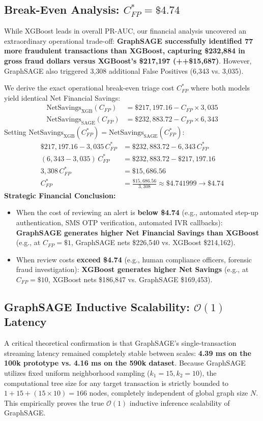 \documentclass[11pt,a4paper]{report}
\begin{document}
\subsection{Break-Even Analysis: $C_{FP}^* = \$4.74$}
While XGBoost leads in overall PR-AUC, our financial analysis uncovered an extraordinary operational trade-off:
\textbf{GraphSAGE successfully identified 77 more fraudulent transactions than XGBoost, capturing \$232,884 in gross fraud dollars versus XGBoost's \$217,197 (++\$15,687)}.
However, GraphSAGE also triggered 3,308 additional False Positives (6,343 vs. 3,035).

We derive the exact operational break-even triage cost $C_{FP}^*$ where both models yield identical Net Financial Savings:
\begin{align}
\text{NetSavings}_{\text{XGB}}(C_{FP}) &= \$217{,}197.16 - C_{FP} \times 3{,}035 \\
\text{NetSavings}_{\text{SAGE}}(C_{FP}) &= \$232{,}883.72 - C_{FP} \times 6{,}343
\end{align}
Setting $\text{NetSavings}_{\text{XGB}}(C_{FP}^*) = \text{NetSavings}_{\text{SAGE}}(C_{FP}^*)$:
\begin{align}
\$217{,}197.16 - 3{,}035 \, C_{FP}^* &= \$232{,}883.72 - 6{,}343 \, C_{FP}^* \\
(6{,}343 - 3{,}035) \, C_{FP}^* &= \$232{,}883.72 - \$217{,}197.16 \\
3{,}308 \, C_{FP}^* &= \$15{,}686.56 \\
C_{FP}^* &= \frac{\$15{,}686.56}{3{,}308} \approx \mathbf{\$4.741999} \rightarrow \mathbf{\$4.74}
\end{align}
\textbf{Strategic Financial Conclusion:}
\begin{itemize}
    \item When the cost of reviewing an alert is \textbf{below \$4.74} (e.g., automated step-up authentication, SMS OTP verification, automated IVR callbacks): \textbf{GraphSAGE generates higher Net Financial Savings than XGBoost} (e.g., at $C_{FP} = \$1$, GraphSAGE nets \$226,540 vs. XGBoost \$214,162).
    \item When review costs \textbf{exceed \$4.74} (e.g., human compliance officers, forensic fraud investigation): \textbf{XGBoost generates higher Net Savings} (e.g., at $C_{FP} = \$10$, XGBoost nets \$186,847 vs. GraphSAGE \$169,453).
\end{itemize}

\subsection{GraphSAGE Inductive Scalability: $\mathcal{O}(1)$ Latency}
A critical theoretical confirmation is that GraphSAGE's single-transaction streaming latency remained completely stable between scales: \textbf{4.39 ms on the 100k prototype vs. 4.16 ms on the 590k dataset}. 
Because GraphSAGE utilizes fixed uniform neighborhood sampling ($k_1 = 15, k_2 = 10$), the computational tree size for any target transaction is strictly bounded to $1 + 15 + (15 \times 10) = 166$ nodes, completely independent of global graph size $N$. This empirically proves the true $\mathcal{O}(1)$ inductive inference scalability of GraphSAGE.
\end{document}
